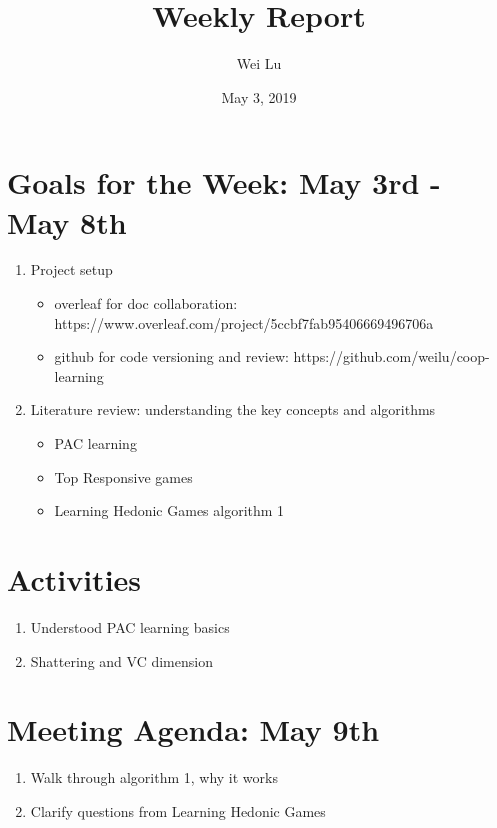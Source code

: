 \documentclass[a4paper]{article}
\title{Weekly Report}
\date{May 3, 2019}
\author{Wei Lu}
\begin{document}
\maketitle

\section{Goals for the Week: May 3rd - May 8th}

\begin{enumerate}
  \item Project setup
  \begin{itemize}
    \item overleaf for doc collaboration: https://www.overleaf.com/project/5ccbf7fab95406669496706a
    \item github for code versioning and review: https://github.com/weilu/coop-learning
  \end{itemize}

  \item Literature review: understanding the key concepts and algorithms
  \begin{itemize}
    \item PAC learning
    \item Top Responsive games
    \item Learning Hedonic Games \cite{ijcai2017-380} algorithm 1
  \end{itemize}

\end{enumerate}


\section{Activities}

\begin{enumerate}
  \item Understood PAC learning basics \cite{Valiant:1984:TL:1968.1972}
  \item Shattering and VC dimension \cite{vc}
\end{enumerate}

\section{Meeting Agenda: May 9th}

\begin{enumerate}
  \item Walk through algorithm 1, why it works
  \item Clarify questions from Learning Hedonic Games \cite{ijcai2017-380}
\end{enumerate}

\end{document}
